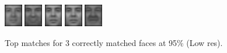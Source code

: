 \begin{figure}[hbt]
  \includegraphics[width=0.07\textwidth]{../results/L_rez/correct95/3/6.jpg}
  \includegraphics[width=0.07\textwidth]{../results/L_rez/correct95/3/7.jpg}
  \includegraphics[width=0.07\textwidth]{../results/L_rez/correct95/3/8.jpg}
  \includegraphics[width=0.07\textwidth]{../results/L_rez/correct95/3/8.jpg}
  \includegraphics[width=0.07\textwidth]{../results/L_rez/correct95/3/10.jpg}
  \caption{Top matches for 3 correctly matched faces at 95\% (Low res).}
  \label{fig:correct95_l}
\end{figure}

~\vfill

